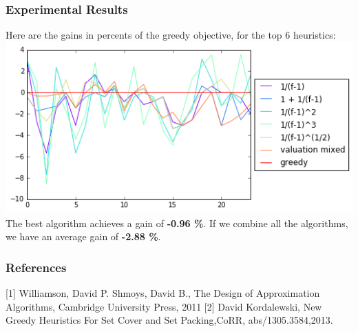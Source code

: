 \documentclass[xcolor=dvipsnames]{beamer}
\begin{document}
\begin{frame}
\frametitle{Experimental Results}
Here are the gains in percents of the greedy objective, for the top 6 heuristics:
\includegraphics[width=\textwidth]{../results/heuristics_best6} \\
The best algorithm achieves a gain of \textbf{-0.96 \%}. If we combine all the algorithms, we have an average gain of \textbf{-2.88 \%}.
\end{frame}

\begin{frame}
\frametitle{References}
\begin{thebibliography}{1}
 [1] Williamson, David P.
Shmoys, David B., The Design of Approximation Algorithms, Cambridge University Press, 2011
 [2] David Kordalewski, New Greedy Heuristics For Set Cover and Set Packing,CoRR, abs/1305.3584,2013.

\end{thebibliography}
\end{frame}
\end{document}

